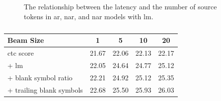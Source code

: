 \begin{figure}
  \centering
  

  \caption{The relationship between the latency and the number of source tokens
    in \acs{ar}, \acs{nar}, and \acs{nar} models with \acs{lm}.}%
  \label{fig:ngrams:speed}
\end{figure}


\begin{table}
  \centering

  \begin{tabular}{lcccc}
    \toprule
    Beam Size &  1 &  5 &  10 &  20 \\
    \midrule
    \acs{ctc} score & 21.67 & 22.06 & 22.13 & 22.17 \\
    \quad + \acs{lm} & 22.05 & 24.64 & 24.77 & 25.12 \\
    \quad + blank symbol ratio & 22.21 & 24.92 & 25.12 & 25.35 \\
    \quad + trailing blank symbols  & 22.68 & 25.50 & 25.93 & 26.03 \\
    \bottomrule
  \end{tabular}

  \caption{}%
  \label{tab:}
\end{table}






